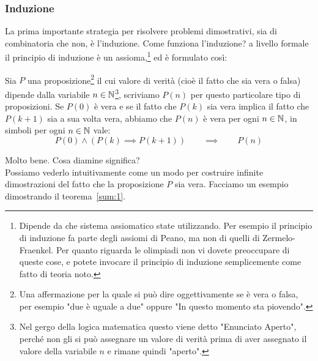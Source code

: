 \documentclass[11pt]{scrartcl}
\begin{document}
	\subsubsection{Induzione}
	La prima importante strategia per risolvere problemi dimostrativi, sia di combinatoria che non, è l'induzione.
	Come funziona l'induzione? a livello formale il principio di induzione è un assioma,\footnote{Dipende da che sistema assiomatico state utilizzando. Per esempio il principio di induzione fa parte degli assiomi di Peano, ma non di quelli di Zermelo-Fraenkel. Per quanto riguarda le olimpiadi non vi dovete preoccupare di queste cose, e potete invocare il principio di induzione semplicemente come fatto di teoria noto.} ed è formulato così:
	\begin{proposition}[Induzione]
		Sia $P$ una proposizione\footnote{Una affermazione per la quale si può dire oggettivamente se è vera o falsa, per esempio "due è uguale a due" oppure "In questo momento sta piovendo".} il cui valore di verità (cioè il fatto che sia vera o falsa) dipende dalla variabile $n\in\mathbb N$\footnote{Nel gergo della logica matematica questo viene detto "Enunciato Aperto", perché non gli si può assegnare un valore di verità prima di aver assegnato il valore della variabile $n$ e rimane quindi "aperto".}, scriviamo $P(n)$ per questo particolare tipo di proposizioni. Se $P(0)$ è vera e se il fatto che $P(k)$ sia vera implica il fatto che $P(k+1)$ sia a sua volta vera, abbiamo che $P(n)$ è vera per ogni $n\in\mathbb N$, in simboli per ogni $n\in\mathbb N$ vale:
		$$P(0) \land (P(k)\implies P(k+1)) \qquad \implies \qquad P(n) $$
	\end{proposition}
	Molto bene. Cosa diamine significa? \\
	Possiamo vederlo intuitivamente come un modo per costruire infinite dimostrazioni del fatto che la proposizione $P$ sia vera. Facciamo un esempio dimostrando il teorema~\ref{sum:1}.
\end{document}
